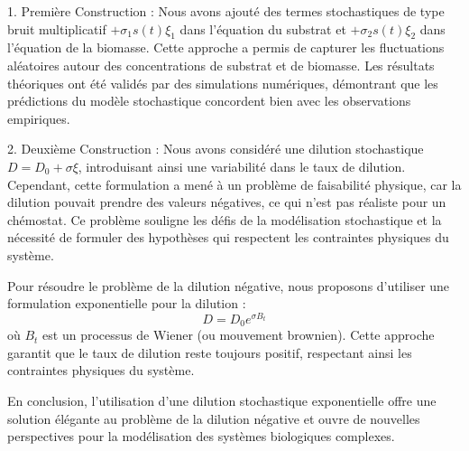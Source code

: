 \documentclass[12pt,a4paper]{report}%
\begin{document}
1. Première Construction : Nous avons ajouté des termes stochastiques de type bruit multiplicatif $ + \sigma_1 s(t) \xi_1 $ dans l'équation du substrat et $ + \sigma_2 s(t) \xi_2 $ dans l'équation de la biomasse. Cette approche a permis de capturer les fluctuations aléatoires autour des concentrations de substrat et de biomasse. Les résultats théoriques ont été validés par des simulations numériques, démontrant que les prédictions du modèle stochastique concordent bien avec les observations empiriques.

2. Deuxième Construction : Nous avons considéré une dilution stochastique $ D = D_0 + \sigma \xi $, introduisant ainsi une variabilité dans le taux de dilution. Cependant, cette formulation a mené à un problème de faisabilité physique, car la dilution pouvait prendre des valeurs négatives, ce qui n'est pas réaliste pour un chémostat. Ce problème souligne les défis de la modélisation stochastique et la nécessité de formuler des hypothèses qui respectent les contraintes physiques du système.\\
\vspace*{0.1cm}

Pour résoudre le problème de la dilution négative, nous proposons d'utiliser une formulation exponentielle pour la dilution :
\[ D = D_0 e^{\sigma B_t} \]
où \( B_t \) est un processus de Wiener (ou mouvement brownien). Cette approche garantit que le taux de dilution reste toujours positif, respectant ainsi les contraintes physiques du système.\\
\vspace*{0.1cm}

En conclusion, l'utilisation d'une dilution stochastique exponentielle offre une solution élégante au problème de la dilution négative et ouvre de nouvelles perspectives pour la modélisation des systèmes biologiques complexes.
\newpage
\end{document}
